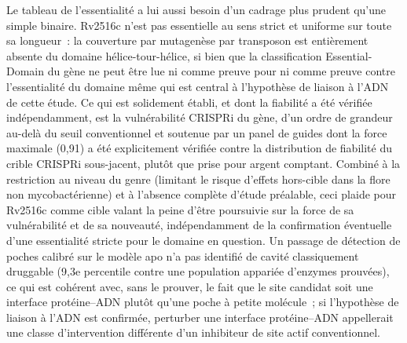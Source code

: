 \documentclass[11pt,a4paper]{article}
\begin{document}
Le tableau de l'essentialité a lui aussi besoin d'un cadrage plus prudent qu'une simple binaire.
Rv2516c n'est pas essentielle au sens strict et uniforme sur toute sa longueur~: la couverture par
mutagenèse par transposon est entièrement absente du domaine hélice-tour-hélice, si bien que la
classification Essential-Domain du gène ne peut être lue ni comme preuve pour ni comme preuve
contre l'essentialité du domaine même qui est central à l'hypothèse de liaison à l'ADN de cette
étude. Ce qui est solidement établi, et dont la fiabilité a été vérifiée indépendamment, est la
vulnérabilité CRISPRi du gène, d'un ordre de grandeur au-delà du seuil conventionnel et soutenue par
un panel de guides dont la force maximale (0,91) a été explicitement vérifiée contre la
distribution de fiabilité du crible CRISPRi sous-jacent, plutôt que prise pour argent comptant.
Combiné à la restriction au niveau du genre (limitant le risque d'effets hors-cible dans la flore
non mycobactérienne) et à l'absence complète d'étude préalable, ceci plaide pour Rv2516c comme
cible valant la peine d'être poursuivie sur la force de sa vulnérabilité et de sa nouveauté,
indépendamment de la confirmation éventuelle d'une essentialité stricte pour le domaine en
question. Un passage de détection de poches calibré sur le modèle apo n'a pas identifié de cavité
classiquement druggable (9,3e percentile contre une population appariée d'enzymes prouvées), ce qui
est cohérent avec, sans le prouver, le fait que le site candidat soit une interface protéine--ADN
plutôt qu'une poche à petite molécule~; si l'hypothèse de liaison à l'ADN est confirmée, perturber
une interface protéine--ADN appellerait une classe d'intervention différente d'un inhibiteur de
site actif conventionnel.
\end{document}
